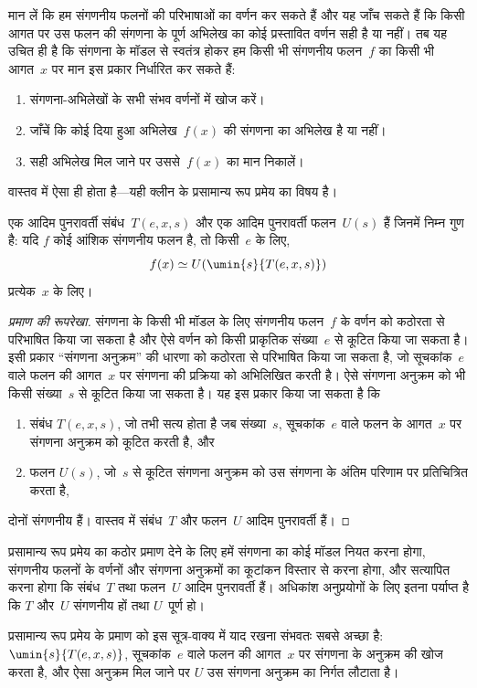 \documentclass[../../../include/open-logic-section]{subfiles}
\begin{document}

मान लें कि हम संगणनीय फलनों की परिभाषाओं का वर्णन कर सकते हैं और यह जाँच
सकते हैं कि किसी आगत पर उस फलन की संगणना के पूर्ण अभिलेख का कोई प्रस्तावित
वर्णन सही है या नहीं। तब यह उचित ही है कि संगणना के मॉडल से स्वतंत्र होकर
हम किसी भी संगणनीय फलन~$f$ का किसी भी आगत~$x$ पर मान इस प्रकार निर्धारित
कर सकते हैं:
\begin{enumerate}
  \item संगणना-अभिलेखों के सभी संभव वर्णनों में खोज करें।
  \item जाँचें कि कोई दिया हुआ अभिलेख~$f(x)$ की संगणना का अभिलेख है या नहीं।
  \item सही अभिलेख मिल जाने पर उससे~$f(x)$ का मान निकालें।
\end{enumerate}
वास्तव में ऐसा ही होता है—यही क्लीन के प्रसामान्य रूप प्रमेय का विषय है।

\begin{thm}[क्लीन का प्रसामान्य रूप प्रमेय]
एक आदिम पुनरावर्ती संबंध~$T(e, x, s)$ और एक आदिम पुनरावर्ती फलन~$U(s)$
हैं जिनमें निम्न गुण है: यदि $f$ कोई आंशिक संगणनीय फलन है, तो किसी~$e$ के लिए,
\[
f(x) \simeq U(\umin{s}{T(e, x, s)})
\]
प्रत्येक~$x$ के लिए।
\end{thm}

\begin{proof}[प्रमाण की रूपरेखा]
संगणना के किसी भी मॉडल के लिए संगणनीय फलन~$f$ के वर्णन को कठोरता से
परिभाषित किया जा सकता है और ऐसे वर्णन को किसी प्राकृतिक संख्या~$e$ से
कूटित किया जा सकता है। इसी प्रकार ``संगणना अनुक्रम'' की धारणा को कठोरता
से परिभाषित किया जा सकता है, जो सूचकांक~$e$ वाले फलन की आगत~$x$ पर
संगणना की प्रक्रिया को अभिलिखित करती है। ऐसे संगणना अनुक्रम को भी किसी
संख्या~$s$ से कूटित किया जा सकता है। यह इस प्रकार किया जा सकता है कि
\begin{enumerate}
  \item संबंध $T(e, x, s)$, जो तभी सत्य होता है जब संख्या~$s$, सूचकांक~$e$
  वाले फलन के आगत~$x$ पर संगणना अनुक्रम को कूटित करती है, और
  \item फलन $U(s)$, जो~$s$ से कूटित संगणना अनुक्रम को उस संगणना के
  अंतिम परिणाम पर प्रतिचित्रित करता है,
\end{enumerate}
दोनों संगणनीय हैं। वास्तव में संबंध~$T$ और फलन~$U$ आदिम पुनरावर्ती हैं।
\end{proof}

\begin{explain}
प्रसामान्य रूप प्रमेय का कठोर प्रमाण देने के लिए हमें संगणना का कोई मॉडल
नियत करना होगा, संगणनीय फलनों के वर्णनों और संगणना अनुक्रमों का कूटांकन
विस्तार से करना होगा, और सत्यापित करना होगा कि संबंध~$T$ तथा फलन~$U$
आदिम पुनरावर्ती हैं। अधिकांश अनुप्रयोगों के लिए इतना पर्याप्त है कि $T$
और~$U$ संगणनीय हों तथा $U$~पूर्ण हो।

प्रसामान्य रूप प्रमेय के प्रमाण को इस सूत्र-वाक्य में याद रखना संभवतः
सबसे अच्छा है: $\umin{s}{T(e, x, s)}$, सूचकांक~$e$ वाले फलन की आगत~$x$
पर संगणना के अनुक्रम की खोज करता है, और ऐसा अनुक्रम मिल जाने पर $U$
उस संगणना अनुक्रम का निर्गत लौटाता है।
\end{explain}
\end{document}
